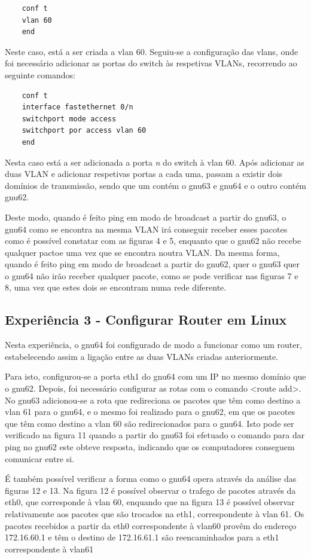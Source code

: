 \documentclass[article, a4paper, 11pt, oneside]{memoir}
\begin{document}
\begin{lstlisting}
	conf t
	vlan 60
	end
\end{lstlisting} 
Neste caso, está a ser criada a vlan 60. 
Seguiu-se a configuração das vlans, onde foi necessário adicionar as portas do switch às respetivas VLANs, recorrendo ao seguinte comandos:

\begin{lstlisting}
	conf t
	interface fastethernet 0/n
	switchport mode access
	switchport por access vlan 60
	end
\end{lstlisting} 

Nesta caso está a ser adicionada a porta \emph{n} do switch à vlan 60. 
Após adicionar as duas VLAN e adicionar respetivas portas a cada uma, 
passam a existir dois domínios de transmissão, sendo que um contém o gnu63 e gnu64 e o outro contém gnu62.

Deste modo, quando é feito ping em modo de broadcast a partir do gnu63, o gnu64 como se encontra na mesma VLAN irá conseguir 
receber esses pacotes como é possível constatar com as figuras 4 e 5, enquanto que o gnu62 não recebe qualquer pactoe uma vez que se encontra noutra VLAN.
Da mesma forma, quando é feito ping em modo de broadcast a partir do gnu62, quer o gnu63 quer o gnu64 não irão receber qualquer pacote, como se pode verificar
nas figuras 7 e 8, uma vez que estes dois se encontram numa rede diferente.


\subsection{Experiência 3 - Configurar Router em Linux}

Nesta experiência, o gnu64 foi configurado de modo a funcionar como um router, estabelecendo assim a ligação entre as duas VLANs criadas anteriormente.

Para isto, configurou-se a porta eth1 do gnu64 com um IP no mesmo domínio que o gnu62. Depois, foi necessário configurar as rotas com o comando <route add>. 
No gnu63 adicionou-se a rota que redireciona os pacotes que têm como destino a vlan 61 para o gnu64, 
e o mesmo foi realizado para o gnu62, em que os pacotes que têm como destino a vlan 60 são redirecionados para o gnu64.
Isto pode ser verificado na figura 11 quando a partir do gnu63 foi efetuado o comando para dar ping no gnu62 este obteve resposta, indicando que os computadores conseguem comunicar entre si.

É também possível verificar a forma como o gnu64 opera através da análise das figuras 12 e 13. Na figura 12 é possível observar o trafego de pacotes através da eth0, 
que corresponde à vlan 60, enquando que na figura 13 é possível observar relativamente aos pacotes que são trocados na eth1, correspondente à vlan 61. Os pacotes recebidos a partir da
eth0 correspondente à vlan60 provêm do endereço 172.16.60.1 e têm o destino de 172.16.61.1 são reencaminhados para a eth1 correspondente à vlan61
\end{document}
